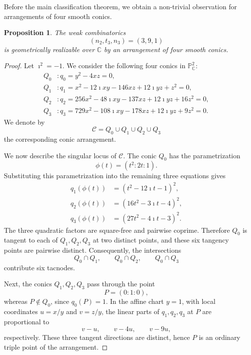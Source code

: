 \documentclass[11pt]{article}
\theoremstyle{plain}
\newtheorem{proposition}[thm]{Proposition}
\theoremstyle{definition}
\begin{document}
Before the main classification theorem, we obtain a non-trivial observation for arrangements of four smooth conics.


\begin{proposition}
\label{391}
The weak combinatorics
\[
        (n_2,t_3,n_3)=(3,9,1)
\]
is geometrically realizable over \(\mathbb C\) by an arrangement of four smooth conics.
\end{proposition}

\begin{proof}
Let \(\imath^2=-1\). We consider the following four conics in
\(\mathbb P^2_{\mathbb C}\):
\[
\begin{aligned}
Q_0&: q_0=y^2-4xz=0,\\
Q_1&: q_1=x^2-12\imath xy-146xz+12\imath yz+z^2=0,\\
Q_2&: q_2=256x^2-48\imath xy-137xz+12\imath yz+16z^2=0,\\
Q_3&: q_3=729x^2-108\imath xy-178xz+12\imath yz+9z^2=0.
\end{aligned}
\]
We denote by
\[
        \mathcal C=Q_0\cup Q_1\cup Q_2\cup Q_3
\]
the corresponding conic arrangement.

\noindent
We now describe the singular locus of \(\mathcal C\). The conic \(Q_0\)
has the parametrization
\[
        \phi(t)=(t^2:2t:1).
\]
Substituting this parametrization into the remaining three equations gives
\[
\begin{aligned}
q_1(\phi(t))&=(t^2-12\imath t-1)^2,\\
q_2(\phi(t))&=(16t^2-3\imath t-4)^2,\\
q_3(\phi(t))&=(27t^2-4\imath t-3)^2.
\end{aligned}
\]
The three quadratic factors are square-free and pairwise coprime. Therefore
\(Q_0\) is tangent to each of \(Q_1,Q_2,Q_3\) at two distinct points, and these
six tangency points are pairwise distinct. Consequently, the intersections
\[
        Q_0\cap Q_1,\qquad Q_0\cap Q_2,\qquad Q_0\cap Q_3
\]
contribute six tacnodes.

Next, the conics \(Q_1,Q_2,Q_3\) pass through the point
\[
        P=(0:1:0),
\]
whereas \(P\notin Q_0\), since \(q_0(P)=1\). In the affine chart \(y=1\),
with local coordinates \(u=x/y\) and \(v=z/y\), the linear parts of
\(q_1,q_2,q_3\) at \(P\) are proportional to
\[
        v-u,\qquad v-4u,\qquad v-9u,
\]
respectively. These three tangent directions are distinct, hence \(P\) is an
ordinary triple point of the arrangement.


\end{proof}
\end{document}
